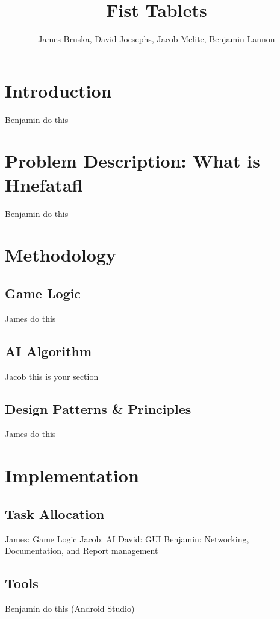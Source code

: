 \documentclass{article}
\title{Fist Tablets}
\author{James Bruska, David Joesephs, Jacob Melite, Benjamin Lannon}
\begin{document}
\maketitle
\tableofcontents

\section{Introduction}
Benjamin do this

\section{Problem Description: What is Hnefatafl}
Benjamin do this

\section{Methodology}

\subsection{Game Logic}
James do this

\subsection{AI Algorithm}
Jacob this is your section

\subsection{Design Patterns \& Principles}
James do this

\section{Implementation}

\subsection{Task Allocation}
James: Game Logic\newline
Jacob: AI\newline
David: GUI\newline
Benjamin: Networking, Documentation, and Report management

\subsection{Tools}
Benjamin do this (Android Studio)
\end{document}
